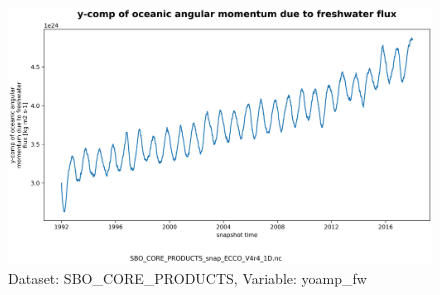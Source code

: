 \begin{figure}[H]
\centering
\includegraphics[scale=0.55]{../images/plots/v4r4/oneD_plots/SBO_Core_Products/yoamp_fw.png}
\caption{Dataset: SBO\_CORE\_PRODUCTS, Variable: yoamp\_fw}
\label{tab:table-SBO_CORE_PRODUCTS_yoamp_fw-Plot}
\end{figure}
\newpage
\pagebreak
